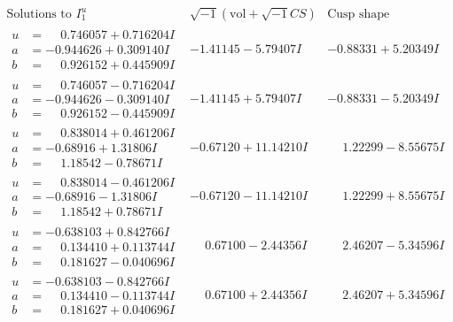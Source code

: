 \documentclass[1p]{elsarticle_modified}
\theoremstyle{definition}
\newcommand{\I}{\sqrt{-1}}
\begin{document}
$$\begin{array}{c|c|c}  
\text{Solutions to }I^u_{1}& \I (\text{vol} + \sqrt{-1}CS) & \text{Cusp shape}\\
 \hline 
\begin{aligned}
u &= \phantom{-}0.746057 + 0.716204 I \\
a &= -0.944626 + 0.309140 I \\
b &= \phantom{-}0.926152 + 0.445909 I\end{aligned}
 & -1.41145 - 5.79407 I & -0.88331 + 5.20349 I \\ \hline\begin{aligned}
u &= \phantom{-}0.746057 - 0.716204 I \\
a &= -0.944626 - 0.309140 I \\
b &= \phantom{-}0.926152 - 0.445909 I\end{aligned}
 & -1.41145 + 5.79407 I & -0.88331 - 5.20349 I \\ \hline\begin{aligned}
u &= \phantom{-}0.838014 + 0.461206 I \\
a &= -0.68916 + 1.31806 I \\
b &= \phantom{-}1.18542 - 0.78671 I\end{aligned}
 & -0.67120 + 11.14210 I & \phantom{-}1.22299 - 8.55675 I \\ \hline\begin{aligned}
u &= \phantom{-}0.838014 - 0.461206 I \\
a &= -0.68916 - 1.31806 I \\
b &= \phantom{-}1.18542 + 0.78671 I\end{aligned}
 & -0.67120 - 11.14210 I & \phantom{-}1.22299 + 8.55675 I \\ \hline\begin{aligned}
u &= -0.638103 + 0.842766 I \\
a &= \phantom{-}0.134410 + 0.113744 I \\
b &= \phantom{-}0.181627 - 0.040696 I\end{aligned}
 & \phantom{-}0.67100 - 2.44356 I & \phantom{-}2.46207 - 5.34596 I \\ \hline\begin{aligned}
u &= -0.638103 - 0.842766 I \\
a &= \phantom{-}0.134410 - 0.113744 I \\
b &= \phantom{-}0.181627 + 0.040696 I\end{aligned}
 & \phantom{-}0.67100 + 2.44356 I & \phantom{-}2.46207 + 5.34596 I \\ \hline\begin{aligned}

\end{aligned}
\end{array}$$
\end{document}
